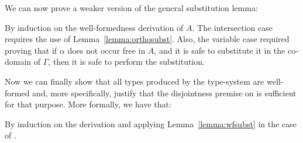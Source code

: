 
We can now prove a weaker version of the general substitution lemma:

%
{By induction on the well-formedness derivation of $A$.
The intersection case requires the use of Lemma~\ref{lemma:orthosubst}.
Also, the variable case required proving that if $\alpha$ does not occur free in $A$, and it is safe
to substitute it in the co-domain of $\Gamma$, then it is safe to perform the substitution.}

Now we can finally show that all types produced by the type-system are well-formed and,
more specifically, justify that the disjointness premise on  is sufficient for that 
purpose.
More formally, we have that:

{By induction on the derivation and applying
  Lemma~\ref{lemma:wfsubst} in the case of .}

